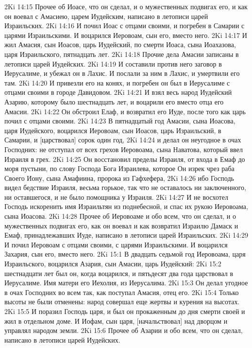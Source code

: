 2Ki 14:15  Прочее об Иоасе, что он сделал, и о мужественных подвигах его, и как он воевал с Амасиею, царем Иудейским, написано в летописи царей Израильских.
2Ki 14:16  И почил Иоас с отцами своими, и погребен в Самарии с царями Израильскими. И воцарился Иеровоам, сын его, вместо него.
2Ki 14:17  И жил Амасия, сын Иоасов, царь Иудейский, по смерти Иоаса, сына Иоахазова, царя Израильского, пятнадцать лет.
2Ki 14:18  Прочие дела Амасии записаны в летописи царей Иудейских.
2Ki 14:19  И составили против него заговор в Иерусалиме, и убежал он в Лахис. И послали за ним в Лахис, и умертвили его там.
2Ki 14:20  И привезли его на конях, и погребен он был в Иерусалиме с отцами своими в городе Давидовом.
2Ki 14:21  И взял весь народ Иудейский Азарию, которому было шестнадцать лет, и воцарили его вместо отца его Амасии.
2Ki 14:22  Он обстроил Елаф, и возвратил его Иуде, после того как царь почил с отцами своими.
2Ki 14:23  В пятнадцатый год Амасии, сына Иоасова, царя Иудейского, воцарился Иеровоам, сын Иоасов, царь Израильский, в Самарии, и [царствовал] сорок один год,
2Ki 14:24  и делал он неугодное в очах Господних: не отступал от всех грехов Иеровоама, сына Наватова, который ввел Израиля в грех.
2Ki 14:25  Он восстановил пределы Израиля, от входа в Емаф до моря пустыни, по слову Господа Бога Израилева, которое Он изрек чрез раба Своего Иону, сына Амафиина, пророка из Гафхефера,
2Ki 14:26  ибо Господь видел бедствие Израиля, весьма горькое, так что не оставалось ни заключенного, ни оставшегося, и не было помощника у Израиля.
2Ki 14:27  И не восхотел Господь искоренить имя Израильтян из поднебесной, и спас их рукою Иеровоама, сына Иоасова.
2Ki 14:28  Прочее об Иеровоаме и обо всем, что он сделал, и о мужественных подвигах его, как он воевал и как возвратил Израилю Дамаск и Емаф, принадлежавших Иуде, написано в летописи царей Израильских.
2Ki 14:29  И почил Иеровоам с отцами своими, с царями Израильскими. И воцарился Захария, сын его, вместо него.
2Ki 15:1  В двадцать седьмой год Иеровоама, царя Израильского, воцарился Азария, сын Амасии, царь Иудейский:
2Ki 15:2  шестнадцати лет был он, когда воцарился, и пятьдесят два года царствовал в Иерусалиме. Имя матери его Иехолия, из Иерусалима.
2Ki 15:3  Он делал угодное в очах Господних во всем так, как поступал Амасия, отец его.
2Ki 15:4  Только высоты не были отменены: народ совершал еще жертвы и курения на высотах.
2Ki 15:5  И поразил Господь царя, и был он прокаженным до дня смерти своей и жил в отдельном доме. И Иофам, сын царя, [начальствовал] над дворцом и управлял народом земли.
2Ki 15:6  Прочее об Азарии и обо всем, что он сделал, написано в летописи царей Иудейских.
